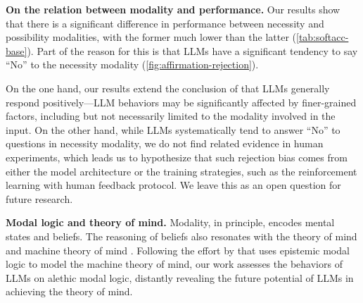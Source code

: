 \vspace{2pt}
\noindent\textbf{On the relation between modality and performance.}
Our results show that there is a significant difference in performance between necessity and possibility modalities, with the former much lower than the latter (\cref{tab:softacc-base}).
Part of the reason for this is that LLMs have a significant tendency to say ``No'' to the necessity modality (\cref{fig:affirmation-rejection}).

On the one hand, our results extend the conclusion of \citet{dentella-etal-2023-systematic} that LLMs generally respond positively---LLM behaviors may be significantly affected by finer-grained factors, including but not necessarily limited to the modality involved in the input.
On the other hand, while LLMs systematically tend to answer ``No'' to questions in necessity modality, we do not find related evidence in human experiments, which leads us to hypothesize that such rejection bias comes from either the model architecture or the training strategies, such as the reinforcement learning with human feedback \citep[RLHF;][]{ouyang-etal-2022-training} protocol.
We leave this as an open question for future research.

\vspace{2pt}
\noindent\textbf{Modal logic and theory of mind.}
Modality, in principle, encodes mental states and beliefs.
The reasoning of beliefs also resonates with the theory of mind  and machine theory of mind .
Following the effort by \citet{sileo-lernould-2023-mindgames} that uses epistemic modal logic to model the machine theory of mind, our work assesses the behaviors of LLMs on alethic modal logic, distantly revealing the future potential of LLMs in achieving the theory of mind.
